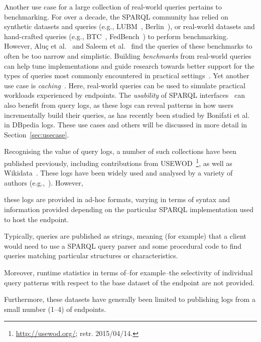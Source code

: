 Another use case for a large collection of real-world queries pertains to benchmarking. For over a decade, the SPARQL community has relied on synthetic datasets and queries (e.g., LUBM~\cite{GuoPH05}, Berlin~\cite{bizer2009berlin}), or real-world datasets and hand-crafted queries (e.g., BTC~\cite{Neumann08}, FedBench~\cite{SchmidtGHLST11}) to perform benchmarking. However, Alu{\c{c}} et al.~\cite{AlucHOD14} and Saleem et al.~\cite{SaleemSCBMN19} find the queries of these benchmarks to often be too narrow and simplistic. Building \textit{benchmarks} from real-world queries can help tune implementations and guide research towards better support for the types of queries most commonly encountered in practical settings~\cite{MorseyLAN11,BailAPWHGG12,WuFYBY14,SaleemMN15,PacaciBO20,ArroyueloHNRRS21}. Yet another use case is \textit{caching}~\cite{WilliamsW11,LampoVDR11,LoustaunauH21}. Here, real-world queries can be used to simulate practical workloads experienced by endpoints. The \textit{usability} of SPARQL interfaces~\cite{LehmannB11,RietveldH14,Campinas14,BonifatiMT20} can also benefit from query logs, as these logs can reveal patterns in how users incrementally build their queries, as has recently been studied by Bonifati et al.~\cite{BonifatiMT20} in DBpedia logs. These use cases and others will be discussed in more  detail in Section~\ref{sec:usecase}.

Recognising the value of query logs, a number of such collections have been published previously, including contributions from USEWOD~\cite{LuczakABH16}\footnote{\url{http://usewod.org/}; retr. 2015/04/14.}, as well as Wikidata~\cite{MalyshevKGGB18}. These logs have been widely used and analysed by a variety of authors (e.g.,~\cite{AriasFMF11,PicalausaV11,Rietveld14,BonifatiMT17,MalyshevKGGB18,BonifatiMT19}). However, 
\begin{inparaenum}[i)]
\item these logs are provided in ad-hoc formats, varying in terms of syntax and information provided depending on the particular SPARQL implementation used to host the endpoint. 
\item Typically, queries are published as strings, meaning (for example) that a client would need to use a SPARQL query parser and some procedural code to find queries matching particular structures or characteristics. \item Moreover, runtime statistics in terms of--for example--the selectivity of individual query patterns with respect to the base dataset of the endpoint are not provided. 
\item Furthermore, these datasets have generally been limited to publishing logs from a small number (1--4) of endpoints.  
\end{inparaenum}

